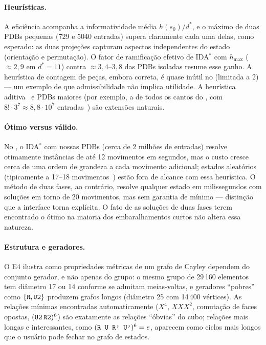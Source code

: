 \paragraph{Heurísticas.} A eficiência acompanha a informatividade média $h(s_0)/d^*$, e o máximo de duas PDBs pequenas (729 e 5040 entradas) supera claramente cada uma delas, como esperado: as duas projeções capturam aspectos independentes do estado (orientação e permutação). O fator de ramificação efetivo de IDA$^*$ com $h_{\max}$ ($\approx2{,}9$ em $d^*=11$) contra $\approx3{,}4$--$3{,}8$ das PDBs isoladas resume esse ganho. A heurística de contagem de peças, embora correta, é quase inútil no  (limitada a 2) --- um exemplo de que admissibilidade não implica utilidade. A heurística aditiva~\cite{felner2004} e PDBs maiores (por exemplo, a de todos os cantos do , com $8!\cdot3^7\approx8{,}8\cdot10^7$ entradas~\cite{korf1997}) são extensões naturais.

\paragraph{Ótimo versus válido.} No , o IDA$^*$ com nossas PDBs (cerca de 2 milhões de entradas) resolve otimamente instâncias de até 12 movimentos em segundos, mas o custo cresce cerca de uma ordem de grandeza a cada movimento adicional; estados aleatórios (tipicamente a 17--18 movimentos~\cite{rokicki2014}) estão fora de alcance com essa heurística. O método de duas fases, ao contrário, resolve qualquer estado em milissegundos com soluções em torno de 20 movimentos, mas sem garantia de mínimo --- distinção que a interface torna explícita. O fato de as soluções de duas fases terem encontrado o ótimo na maioria dos embaralhamentos curtos não altera essa natureza.

\paragraph{Estrutura e geradores.} O E4 ilustra como propriedades métricas de um grafo de Cayley dependem do conjunto gerador, e não apenas do grupo: o mesmo grupo de 29\,160 elementos tem diâmetro 17 ou 14 conforme se admitam meias-voltas, e geradores ``pobres'' como $\{\texttt{R},\texttt{U2}\}$ produzem grafos longos (diâmetro 25 com 14\,400 vértices). As relações mínimas encontradas automaticamente ($X^4$, $XXX^2$, comutação de faces opostas, $(\texttt{U2}\,\texttt{R2})^6$) são exatamente as relações ``óbvias'' do cubo; relações mais longas e interessantes, como $(\texttt{R U R' U'})^6=e$, aparecem como ciclos mais longos que o usuário pode fechar no grafo de estados.

